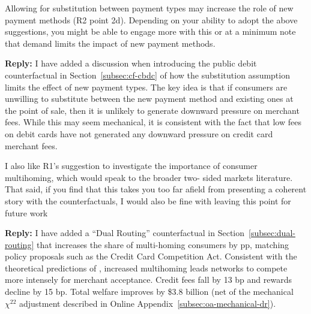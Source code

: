 \documentclass[main.tex]{subfiles}
\begin{document}
\begin{refsection}
\begin{refcommentnoclear}
Allowing for substitution between payment types may increase the role of new payment methods (R2 point 2d).
Depending on your ability to adopt the above suggestions, you might be able to engage more with this or at a minimum note that demand limits the impact of new payment methods.

\end{refcommentnoclear}

\textbf{Reply:} I have added a discussion when introducing the public debit counterfactual in Section~\ref{subsec:cf-cbdc} of how the substitution assumption limits the effect of new payment types.
The key idea is that if consumers are unwilling to substitute between the new payment method and existing ones at the point of sale, then it is unlikely to generate downward pressure on merchant fees.
While this may seem mechanical, it is consistent with the fact that low fees on debit cards have not generated any downward pressure on credit card merchant fees.

\begin{refcommentnoclear}
I also like R1's suggestion to investigate the importance of consumer multihoming, which would speak to the broader two- sided markets literature.
That said, if you find that this takes you too far afield from presenting a coherent story with the counterfactuals, I would also be fine with leaving this point for future work

\end{refcommentnoclear}

\textbf{Reply:} I have added a ``Dual Routing'' counterfactual in Section~\ref{subsec:dual-routing} that increases the share of multi-homing consumers by  pp, matching policy proposals such as the Credit Card Competition Act.
Consistent with the theoretical predictions of \textcite{Teh.etal2022}, increased multihoming leads networks to compete more intensely for merchant acceptance.
Credit fees fall by 13 bp and rewards decline by 15 bp.
Total welfare improves by \$3.8 billion (net of the mechanical $\chi^{22}$ adjustment described in Online Appendix~\ref{subsec:oa-mechanical-dr}).



\end{refsection}
\end{document}
